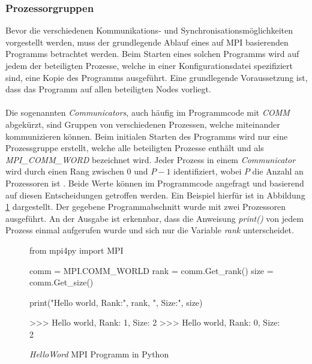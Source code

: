 \subsubsection{Prozessorgruppen}
Bevor die verschiedenen Kommunikations- und Synchronisationsmöglichkeiten vorgestellt werden, muss der grundlegende Ablauf eines auf \ac{MPI} basierenden Programms betrachtet werden. Beim Starten eines solchen Programms wird auf jedem der beteiligten Prozesse, welche in einer Konfigurationsdatei spezifiziert sind, eine Kopie des Programms ausgeführt. Eine grundlegende Voraussetzung ist, dass das Programm auf allen beteiligten Nodes vorliegt. 
\\\\
Die sogenannten \emph{Communicators}, auch häufig im Programmcode mit \emph{COMM} abgekürzt, sind Gruppen von verschiedenen Prozessen, welche miteinander kommunizieren können. Beim initialen Starten des Programms wird nur eine Prozessgruppe erstellt, welche alle beteiligten Prozesse enthält und als \emph{MPI\_COMM\_WORD} bezeichnet wird. Jeder Prozess in einem \emph{Communicator} wird  durch einen Rang zwischen $0$ und $P-1$ identifiziert, wobei $P$ die Anzahl an Prozessoren ist \cite{nielsen2016introduction}. Beide Werte können im Programmcode angefragt und basierend auf diesen Entscheidungen getroffen werden. Ein Beispiel hierfür ist in Abbildung \ref{fig:example_process_group} dargestellt. Der gegebene Programmabschnitt wurde mit zwei Prozessoren ausgeführt. An der Ausgabe ist erkennbar, dass die Anweisung \emph{print()} von jedem Prozess einmal aufgerufen wurde und sich nur die Variable \emph{rank} unterscheidet. 
\begin{figure}
	
	\begin{python}
		from mpi4py import MPI
		
		comm = MPI.COMM_WORLD
		rank = comm.Get_rank()
		size = comm.Get_size()
		
		print("Hello world, Rank:", rank, ", Size:", size)
		
		>>> Hello world, Rank: 1, Size: 2
		>>> Hello world, Rank: 0, Size: 2
	\end{python}
	\caption{\emph{HelloWord} MPI Programm in Python}
	\label{fig:example_process_group}
\end{figure}




